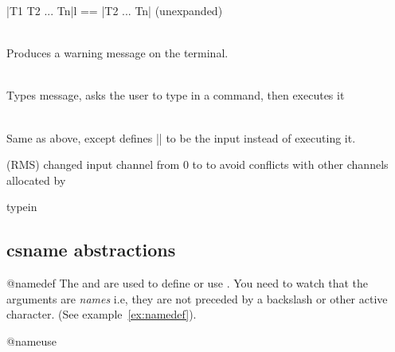  \DescribeMacro{\@cdr}
  |\@cdr T1 T2 ... Tn\@ni|l == |T2 ... Tn|     (unexpanded)

 \DescribeMacro
  \typeout{}\\ Produces a warning message on the terminal.

 \DescribeMacro
  \typein{}\\
        Types message, asks the user to type in a command, then
            executes it

 \DescribeMacro
  \typein{}\\
  Same as above, except defines |\CS| to be the input
                      instead of executing it.

  {(RMS) changed input channel from 0 to  to avoid
     conflicts with other channels allocated by }

\begin{docCommand}{typein}{}

\begin{teX}
\def\typein{%
  \let\@typein\relax
  \@testopt\@xtypein\@typein}
\end{teX}

\begin{teX}
\def\@xtypein[#1]#2{%
  \typeout{#2}%
  \advance\endlinechar\@M
  \read\@inputcheck to#1%
  \advance\endlinechar-\@M
  \@typein}
\end{teX}
\end{docCommand}

\subsection{csname abstractions }

\begin{docCommand}{@namedef}{}
The  and  are used to define or use . You need to watch
that the arguments are \emph{names} i.e, they are not preceded by a backslash or other active character.
(See example~\ref{ex:namedef}).

\end{docCommand}
\begin{docCommand}{@nameuse}{}
\end{docCommand}

\begin{teX}
\def\@namedef#1{\expandafter\def\csname #1\endcsname}
\def\@nameuse#1{\csname #1\endcsname}
\end{teX}


